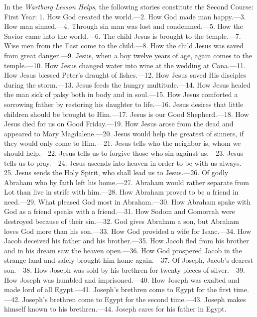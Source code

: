 In the \emph{Wartburg Lesson Helps}, the following stories constitute the Second Course: First Year: 1. How God created the world.—2. How God made man happy.—3. How man sinned.—4. Through sin man was lost and condemned.—5. How the Savior came into the world.—6. The child Jesus is brought to the temple.—7. Wise men from the East come to the child.—8. How the child Jesus was saved from great danger.—9. Jesus, when a boy twelve years of age, again comes to the temple.—10. How Jesus changed water into wine at the wedding at Cana.—11. How Jesus blessed Peter’s draught of fishes.—12. How Jesus saved His disciples during the storm.—13. Jesus feeds the hungry multitude.—14. How Jesus healed the man sick of palsy both in body and in soul.—15. How Jesus comforted a sorrowing father by restoring his daughter to life.—16. Jesus desires that little children should be brought to Him.—17. Jesus is our Good Shepherd.—18. How Jesus died for us on Good Friday.—19. How Jesus arose from the dead and appeared to Mary Magdalene.—20. Jesus would help the greatest of sinners, if they would only come to Him.—21. Jesus tells who the neighbor is, whom we should help.—22. Jesus tells us to forgive those who sin against us.—23. Jesus tells us to pray.—24. Jesus ascends into heaven in order to be with us always.—25. Jesus sends the Holy Spirit, who shall lead us to Jesus.—26. Of godly Abraham who by faith left his home.—27. Abraham would rather separate from Lot than live in strife with him.—28. How Abraham proved to be a friend in need.—29. What pleased God most in Abraham.—30. How Abraham spake with God as a friend speaks with a friend.—31. How Sodom and Gomorrah were destroyed because of their sin.—32. God gives Abraham a son, but Abraham loves God more than his son.—33. How God provided a wife for Isaac.—34. How Jacob deceived his father and his brother.—35. How Jacob fled from his brother and in his dream saw the heaven open.—36. How God prospered Jacob in the strange land and safely brought him home again.—37. Of Joseph, Jacob’s dearest son.—38. How Joseph was sold by his brethren for twenty pieces of silver.—39. How Joseph was humbled and imprisoned.—40. How Joseph was exalted and made lord of all Egypt.—41. Joseph’s brethren come to Egypt for the first time.—42. Joseph’s brethren come to Egypt for the second time.—43. Joseph makes himself known to his brethren.—44. Joseph cares for his father in Egypt.

